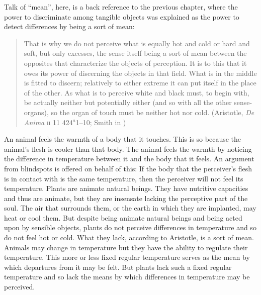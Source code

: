 Talk of ``mean'', here, is a back reference to the previous chapter, where the power to discriminate among tangible objects was explained as the power to detect differences by being a sort of mean:
\begin{quote}
	That is why we do not perceive what is equally hot and cold or hard and soft, but only excesses, the sense itself being a sort of mean between the opposites that characterize the objects of perception. It is to this that it owes its power of discerning the objects in that field. What is in the middle is fitted to discern; relatively to either extreme it can put itself in the place of the other. As what is to perceive white and black must, to begin with, be actually neither but potentially either (and so with all the other sense-organs), so the organ of touch must be neither hot nor cold. (Aristotle, \emph{De Anima} \textsc{ii} 11 424\( ^{a} \)1--10; Smith in \citealt[42]{Barnes:1984uq})
\end{quote}
An animal feels the warmth of a body that it touches. This is so because the animal's flesh is cooler than that body. The animal feels the warmth by noticing the difference in temperature between it and the body that it feels. An argument from blindspots is offered on behalf of this: If the body that the perceiver's flesh is in contact with is the same temperature, then the perceiver will not feel its temperature. Plants are animate natural beings. They have nutritive capacities and thus are animate, but they are insensate lacking the perceptive part of the soul. The air that surrounds them, or the earth in which they are implanted, may heat or cool them. But despite being animate natural beings and being acted upon by sensible objects, plants do not perceive differences in temperature and so do not feel hot or cold. What they lack, according to Aristotle, is a sort of mean. Animals may change in temperature but they have the ability to regulate their temperature. This more or less fixed regular temperature serves as the mean by which departures from it may be felt. But plants lack such a fixed regular temperature and so lack the means by which differences in temperature may be perceived.

